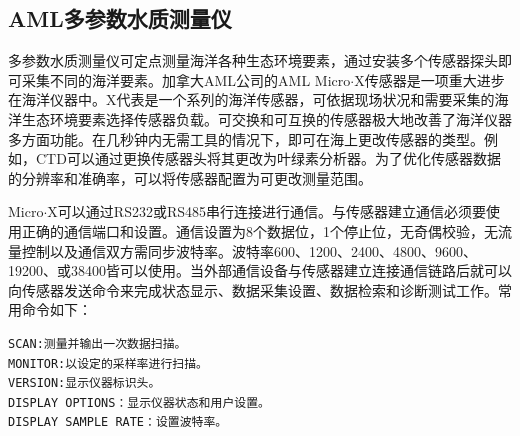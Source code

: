 \subsection{AML多参数水质测量仪}
多参数水质测量仪可定点测量海洋各种生态环境要素，通过安装多个传感器探头即可采集不同的海洋要素。加拿大AML公司的AML Micro$\cdot$X传感器是一项重大进步在海洋仪器中。X代表是一个系列的海洋传感器，可依据现场状况和需要采集的海洋生态环境要素选择传感器负载。可交换和可互换的传感器极大地改善了海洋仪器多方面功能。在几秒钟内无需工具的情况下，即可在海上更改传感器的类型。例如，CTD可以通过更换传感器头将其更改为叶绿素分析器。为了优化传感器数据的分辨率和准确率，可以将传感器配置为可更改测量范围。

Micro$\cdot$X可以通过RS232或RS485串行连接进行通信。与传感器建立通信必须要使用正确的通信端口和设置。通信设置为8个数据位，1个停止位，无奇偶校验，无流量控制以及通信双方需同步波特率。波特率600、1200、2400、4800、9600、19200、或38400皆可以使用。当外部通信设备与传感器建立连接通信链路后就可以向传感器发送命令来完成状态显示、数据采集设置、数据检索和诊断测试工作。常用命令如下：

\begin{lstlisting}
SCAN:测量并输出一次数据扫描。
MONITOR:以设定的采样率进行扫描。
VERSION:显示仪器标识头。
DISPLAY OPTIONS：显示仪器状态和用户设置。
DISPLAY SAMPLE RATE：设置波特率。
\end{lstlisting}

